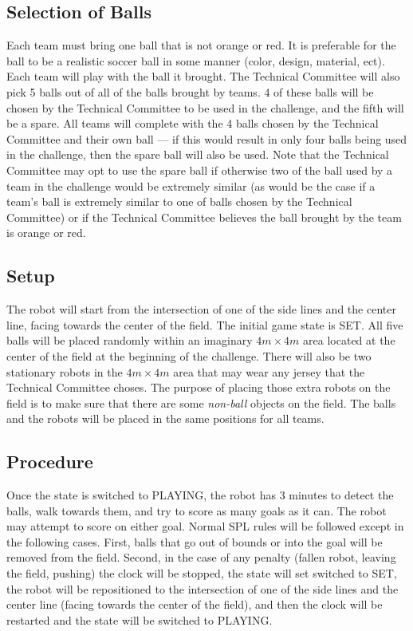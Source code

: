 \documentclass[12pt]{article}
\begin{document}
\subsection{Selection of Balls}

Each team must bring one ball that is not orange or red.  It is preferable for the ball to be a realistic soccer ball in some manner (color, design, material, ect). Each team will play with the ball it brought.  The Technical Committee will also pick 5 balls out of all of the balls brought by teams.  4 of these balls will be chosen by the Technical Committee to be used in the challenge, and the fifth will be a spare.  All teams will complete with the 4 balls chosen by the Technical Committee and their own ball --- if this would result in only four balls being used in the challenge, then the spare ball will also be used.  Note that the Technical Committee may opt to use the spare ball if otherwise two of the ball used by a team in the challenge would be extremely similar (as would be the case if a team's ball is extremely similar to one of balls chosen by the Technical Committee) or if the Technical Committee believes the ball brought by the team is orange or red.

\subsection{Setup}

The robot will start from the intersection of one of the side lines and the center line, facing towards the center of the field. The initial game state is SET. All five balls will be placed randomly within an imaginary $4m \times 4m$ area located at the center of the field at the beginning of the challenge.  There will also be two stationary robots in the  $4m \times 4m$ area that may wear any jersey that the Technical Committee choses. The purpose of placing those extra robots on the field is to make sure that there are some \emph{non-ball} objects on the field. The balls and the robots will be placed in the same positions for all teams.

\subsection{Procedure}

Once the state is switched to PLAYING, the robot has 3 minutes to detect the balls, walk towards them, and try to score as many goals as it can. The robot may attempt to score on either goal.  Normal SPL rules will be followed except in the following cases.  First, balls that go out of bounds or into the goal will be removed from the field. Second, in the case of any penalty (fallen robot, leaving the field, pushing) the clock will be stopped, the state will set switched to SET, the robot will be repositioned to the intersection of one of the side lines and the center line (facing towards the center of the field), and then the clock will be restarted and the state will be switched to PLAYING.
\end{document}
